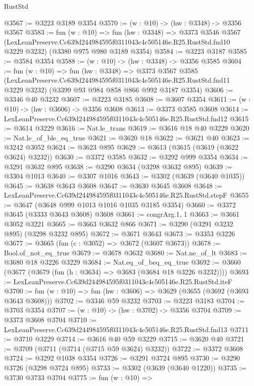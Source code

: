 \begin{lexlean}{RustStd}
\begin{coremodule}
@3567 := @3223 @3189 @3354
@3570 := (w : @10) -> (hw : @3348) -> @3356 @3567
@3583 := fun (w : @10) =>
  fun (hw : @3348) =>
  @3373
    @3546
    @3567
    (LexLeanPreserve.Cc639d244984595f0311043c4c505146e.R25.RustStd.fnd10 @3229 @3232)
    (@3380 @975 @980 @3189 @3354)
@3584 := @3223 @3187
@3585 := @3584 @3354
@3588 := (w : @10) -> (hw : @3348) -> @3356 @3585
@3604 := fun (w : @10) =>
  fun (hw : @3348) =>
  @3373
    @3567
    @3585
    (LexLeanPreserve.Cc639d244984595f0311043c4c505146e.R25.RustStd.fnd11 @3229 @3232)
    (@3399 @93 @984 @858 @866 @992 @3187 @3354)
@3606 := @3346 @40 @3232
@3607 := @3223 @3185
@3608 := @3607 @3354
@3611 := (w : @10) -> (hw : @3606) -> @3356 @3608
@3613 := @3373 @3585 @3608
@3614 := LexLeanPreserve.Cc639d244984595f0311043c4c505146e.R25.RustStd.fnd12
@3615 := @3614 @3229
@3616 := Nat.le_trans
@3619 := @3616 @18 @40 @3229
@3620 := Nat.le_of_ble_eq_true
@3621 := @3620 @18
@3622 := @3621 @40
@3623 := @3242 @3052
@3624 := @3623 @895
@3629 := @3613 (@3615 (@3619 (@3622 @3624) @3232))
@3630 := @3372 @3585
@3632 := @3292 @999 @3354
@3634 := @3291 @3632 @895
@3638 := @3290 @3634 (@3298 @3632 @895)
@3639 := @3304 @1013
@3640 := @3307 @1016
@3643 := @3302 (@3639 (@3640 @1035))
@3645 := @3638 @3643 @3608
@3647 := @3630 @3645 @3608
@3648 := LexLeanPreserve.Cc639d244984595f0311043c4c505146e.R25.RustStd.stepF
@3655 := @3647 (@3648 @999 @1013 @1016 @1035 @3185 @3354)
@3660 := @3372 @3645 (@3333 @3643 @3608) @3608
@3661 := congrArg.{1, 1}
@3663 := @3661 @3052 @3221
@3665 := @3663 @3632 @866
@3671 := @3290 (@3291 @3232 @895) (@3298 @3232 @895)
@3672 := @3671 @3643
@3673 := @3353 @3226
@3677 := @3665 (fun (c : @3052) => @3672 (@3607 @3673))
@3678 := Bool.of_not_eq_true
@3679 := @3678 @3632
@3680 := Nat.ne_of_lt
@3683 := @3680 @18 @3226 @3229
@3684 := Nat.eq_of_beq_eq_true
@3692 := @3660 (@3677 (@3679 (fun (h : @3634) => @3683 (@3684 @18 @3226 @3232))))
@3693 := LexLeanPreserve.Cc639d244984595f0311043c4c505146e.R25.RustStd.iteF
@3700 := fun (w : @10) => fun (hw : @3606) => @3629 (@3655 (@3692 (@3693 @3643 @3608)))
@3702 := @3346 @59 @3232
@3703 := @3223 @3183
@3704 := @3703 @3354
@3707 := (w : @10) -> (hw : @3702) -> @3356 @3704
@3709 := @3373 @3608 @3704
@3710 := LexLeanPreserve.Cc639d244984595f0311043c4c505146e.R25.RustStd.fnd13
@3711 := @3710 @3229
@3714 := @3616 @40 @59 @3229
@3715 := @3620 @40
@3721 := @3709 (@3711 (@3714 (@3715 @59 @3624) @3232))
@3722 := @3372 @3608
@3724 := @3292 @1038 @3354
@3726 := @3291 @3724 @895
@3730 := @3290 @3726 (@3298 @3724 @895)
@3733 := @3302 (@3639 (@3640 @1220))
@3735 := @3730 @3733 @3704
@3775 := fun (w : @10) =>

\end{coremodule}
\end{lexlean}
